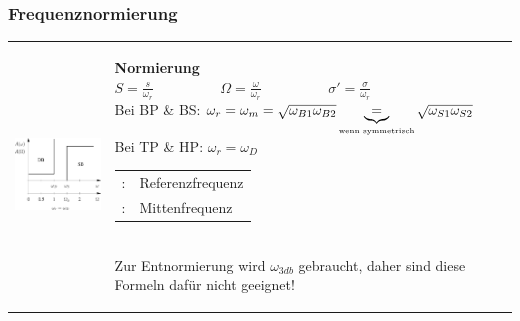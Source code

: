 \subsubsection{Frequenznormierung }
\label{frequenznormierung}
\begin{tabular}{ll}
\parbox{6cm}{
	\includegraphics[width=5cm]{./images/filter-freqnormierung.png}}
& \parbox{12cm}{
	\textbf{Normierung} \\
	$\boxed{S=\frac{s}{\omega_{r}} \hspace{2cm} \Omega=\frac{\omega}{\omega_{r}} 
  \hspace{2cm} \sigma'=\frac{\sigma}{\omega_{r}}}$\\ 

	Bei BP \& BS: $\omega_r = \omega_m =\sqrt{\omega_{B1} \omega_{B2}}
	\underbrace{=}_{\text{\tiny{wenn symmetrisch}}} \sqrt{\omega_{S1} \omega_{S2}}$ \\
	
  Bei TP \& HP: $\omega_r = \omega_D$ \\

  \begin{tabular}{ll}
    $\omega_r$: & Referenzfrequenz \\
    $\omega_m$: & Mittenfrequenz
  \end{tabular} \\
  Zur Entnormierung wird $\omega_{3db}$ gebraucht, daher sind diese Formeln
	dafür nicht geeignet! \\
	}
\end{tabular}


